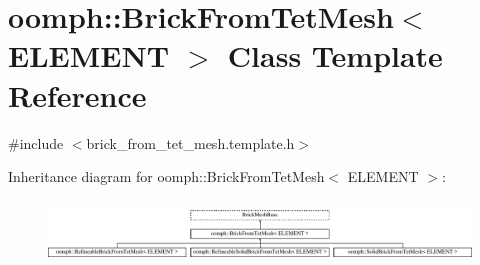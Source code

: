 \hypertarget{classoomph_1_1BrickFromTetMesh}{}\section{oomph\+:\+:Brick\+From\+Tet\+Mesh$<$ E\+L\+E\+M\+E\+NT $>$ Class Template Reference}
\label{classoomph_1_1BrickFromTetMesh}


{\ttfamily \#include $<$brick\+\_\+from\+\_\+tet\+\_\+mesh.\+template.\+h$>$}

Inheritance diagram for oomph\+:\+:Brick\+From\+Tet\+Mesh$<$ E\+L\+E\+M\+E\+NT $>$\+:\begin{figure}[H]
\begin{center}
\leavevmode
\includegraphics[height=1.651917cm]{classoomph_1_1BrickFromTetMesh}
\end{center}
\end{figure}
